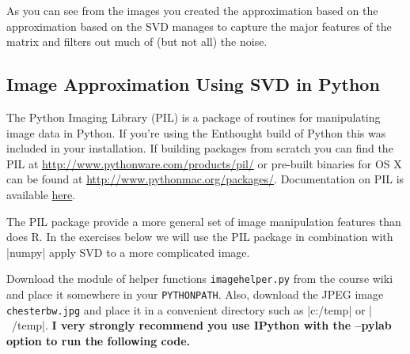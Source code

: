 As you can see from the images you created the approximation based on the approximation based on the SVD manages to capture the major features of the matrix and filters out much of (but not all) the noise.

\subsection*{Image Approximation Using SVD in Python}

The Python Imaging Library (PIL) is a package of routines for manipulating image data in Python. If you're using the Enthought build of Python this was included in your installation. If building packages from scratch you can find the PIL at \href{http://www.pythonware.com/products/pil/}{http://www.pythonware.com/products/pil/} or pre-built binaries for OS X can be found at \href{http://www.pythonmac.org/packages/}{http://www.pythonmac.org/packages/}. Documentation on PIL is available \href{http://www.pythonware.com/library/pil/handbook/index.htm}{here}.

The PIL package provide a more general set of image manipulation features than does R.  In the exercises below we will use the PIL package in combination with |numpy| apply SVD to a more complicated image.

Download the module of helper functions \texttt{imagehelper.py} from the course wiki and place it somewhere in your \texttt{PYTHONPATH}. Also, download the JPEG image \texttt{chesterbw.jpg} and place it in a convenient directory such as |c:/temp| or |~/temp|. {\color{red} \bfseries I very strongly recommend you use IPython with the --pylab option to run the following code.}

